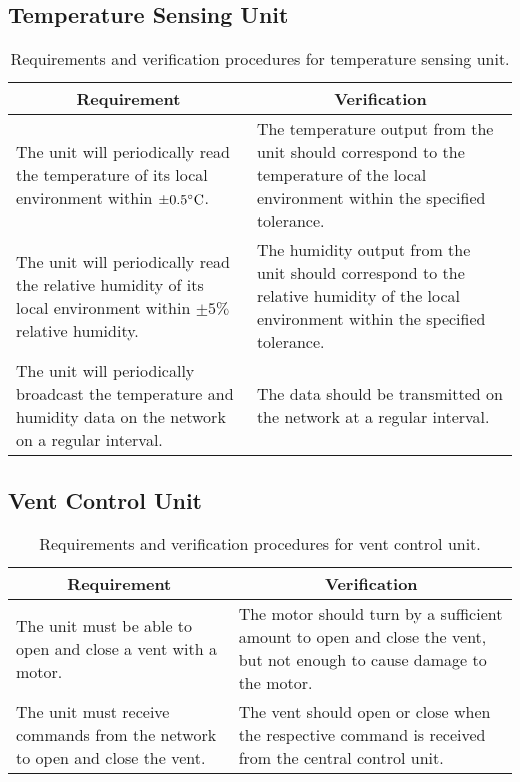 %
%
\subsection{Temperature Sensing Unit}
\begin{table}[htbp]
\begin{tabular}{|p{}|p{}|}
\hline
\multicolumn{1}{|c|}{Requirement} & \multicolumn{1}{|c|}{Verification} \\
\hline\hline
The unit will periodically read the temperature of its local environment within $\pm 0.5^{\circ}{\rm C}$. & The temperature output from the unit should correspond to the temperature of the local environment within the specified tolerance.\\
\hline
The unit will periodically read the relative humidity of its local environment within $\pm 5\%$ relative humidity. & The humidity output from the unit should correspond to the relative humidity of the local environment within the specified tolerance.\\
\hline
The unit will periodically broadcast the temperature and humidity data on the network on a regular interval. & The data should be transmitted on the network at a regular interval.\\
\hline
\end{tabular}
\caption{Requirements and verification procedures for temperature sensing unit.}
\label{tab:tempreq}
\end{table}

%
%
\subsection{Vent Control Unit}
\begin{table}[htbp]
\begin{tabular}{|p{}|p{}|}
\hline
\multicolumn{1}{|c|}{Requirement} & \multicolumn{1}{|c|}{Verification} \\
\hline\hline
The unit must be able to open and close a vent with a motor. & The motor should turn by a sufficient amount to open and close the vent, but not enough to cause damage to the motor.\\
\hline
The unit must receive commands from the network to open and close the vent. & The vent should open or close when the respective command is received from the central control unit. \\
\hline

\end{tabular}
\caption{Requirements and verification procedures for vent control unit.}
\label{tab:ventreq}
\end{table}

